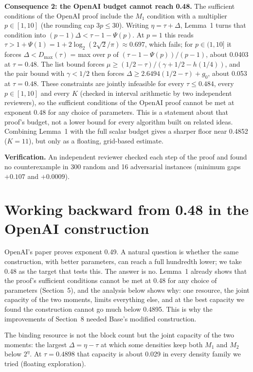 \documentclass[11pt]{article}
\theoremstyle{plain}
\begin{document}
\textbf{Consequence 2: the OpenAI budget cannot reach 0.48.} The sufficient conditions of the OpenAI proof include the $M_1$ condition with a multiplier $p \in [1, 10]$ (the rounding cap $3p \le 30$). Writing $\eta = \tau + \Delta$, Lemma~1 turns that condition into $(p - 1)\Delta < \tau - 1 - \Psi(p)$. At $p = 1$ this reads $\tau > 1 + \Psi(1) = 1 + 2\log_2(2\sqrt2/\pi) \approx 0.697$, which fails; for $p \in (1, 10]$ it forces $\Delta < D_{\max}(\tau)$ = max over $p$ of $(\tau - 1 - \Psi(p))/(p - 1)$, about 0.0403 at $\tau = 0.48$. The list bound forces $\mu \ge (1/2 - \tau)/(\gamma + 1/2 - h(1/4))$, and the pair bound with $\gamma < 1/2$ then forces $\Delta \ge 2.6494(1/2 - \tau) + g_0$, about 0.053 at $\tau = 0.48$. These constraints are jointly infeasible for every $\tau \le 0.484$, every $p \in [1, 10]$ and every $K$ (checked in interval arithmetic by two independent reviewers), so the sufficient conditions of the OpenAI proof cannot be met at exponent 0.48 for any choice of parameters. This is a statement about that proof's budget, not a lower bound for every algorithm built on related ideas. Combining Lemma~1 with the full scalar budget gives a sharper floor near 0.4852 ($K = 11$), but only as a floating, grid-based estimate.

\textbf{Verification.} An independent reviewer checked each step of the proof and found no counterexample in 300 random and 16 adversarial instances (minimum gaps $+0.107$ and $+0.0009$).

\section{Working backward from 0.48 in the OpenAI construction}

OpenAI's paper proves exponent 0.49. A natural question is whether the same construction, with better parameters, can reach a full hundredth lower; we take 0.48 as the target that tests this. The answer is no. Lemma~1 already shows that the proof's sufficient conditions cannot be met at 0.48 for any choice of parameters (Section~5), and the analysis below shows why: one resource, the joint capacity of the two moments, limits everything else, and at the best capacity we found the construction cannot go much below 0.4895. This is why the improvements of Section~8 needed Base's modified construction.

The binding resource is not the block count but the joint capacity of the two moments: the largest $\Delta = \eta - \tau$ at which some densities keep both $M_1$ and $M_2$ below $2^\eta$. At $\tau = 0.4898$ that capacity is about 0.029 in every density family we tried (floating exploration).
\end{document}
